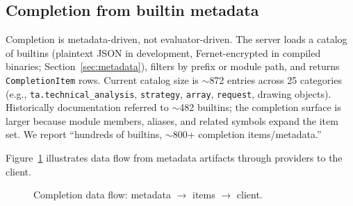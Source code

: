 \documentclass[11pt,a4paper]{article}
\begin{document}
\subsection{Completion from builtin metadata}
\label{sec:feat-completion}

Completion is metadata-driven, not evaluator-driven. The server loads a catalog of
builtins (plaintext JSON in development, Fernet-encrypted in compiled binaries;
Section~\ref{sec:metadata}), filters by prefix or module path, and returns
\texttt{CompletionItem} rows. Current catalog size is \(\sim\)872 entries across 25
categories (e.g., \texttt{ta.technical\_analysis}, \texttt{strategy}, \texttt{array},
\texttt{request}, drawing objects). Historically documentation referred to
\(\sim\)482 builtins; the completion surface is larger because module members, aliases,
and related symbols expand the item set. We report ``hundreds of builtins, \(\sim\)800+
completion items/metadata.''

Figure~\ref{fig:completion} illustrates data flow from metadata artifacts through
providers to the client.

\begin{figure}[t]
\centering
{}
\caption{Completion data flow: metadata \(\rightarrow\) items \(\rightarrow\) client.}
\label{fig:completion}
\end{figure}
\end{document}
